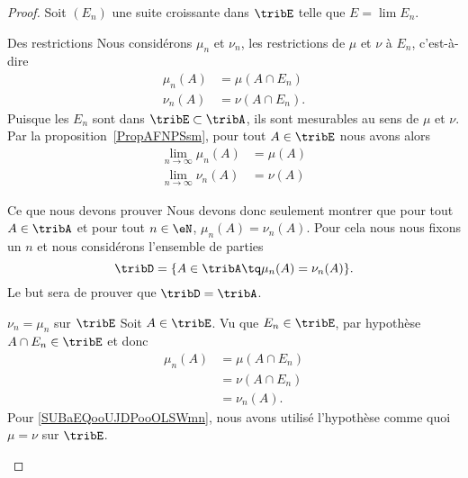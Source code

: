 \begin{proof}
	Soit \( (E_n)\) une suite croissante dans \( \tribE\) telle que \( E=\lim E_n\).

	\begin{subproof}
		\item[Des restrictions]
		Nous considérons \( \mu_n\) et \( \nu_n\), les restrictions de \( \mu\) et \( \nu\) à \( E_n\), c'est-à-dire
		\begin{subequations}
			\begin{align}
				\mu_n(A) & =\mu(A\cap E_n)  \\
				\nu_n(A) & =\nu(A\cap E_n).
			\end{align}
		\end{subequations}
		Puisque les \( E_n\) sont dans \( \tribE\subset\tribA\), ils sont mesurables au sens de \( \mu\) et \( \nu\). Par la proposition~\ref{PropAFNPSsm}, pour tout \( A\in \tribE\) nous avons alors
		\begin{subequations}
			\begin{align}
				\lim_{n\to \infty} \mu_n(A) & =\mu(A) \\
				\lim_{n\to \infty} \nu_n(A) & =\nu(A)
			\end{align}
		\end{subequations}
		\item[Ce que nous devons prouver]
		Nous devons donc seulement montrer que pour tout \( A\in\tribA\) et pour tout \( n\in\eN\), \( \mu_n(A)=\nu_n(A)\). Pour cela nous nous fixons un \( n\) et nous considérons l'ensemble de parties
		\begin{equation}
			\tribD=\{ A\in\tribA\tq\mu_n(A)=\nu_n(A) \}.
		\end{equation}
		Le but sera de prouver que \( \tribD=\tribA\).
		\item[\( \nu_n=\mu_n\) sur \( \tribE\)]
		Soit \( A\in \tribE\). Vu que \( E_n\in \tribE\), par hypothèse \( A\cap E_n\in\tribE\) et donc
		\begin{subequations}
			\begin{align}
				\mu_n(A) & =\mu(A\cap E_n)                                     \\
				         & =\nu(A\cap E_n)        \label{SUBaEQooUJDPooOLSWmn} \\
				         & =\nu_n(A).
			\end{align}
		\end{subequations}
		Pour \eqref{SUBaEQooUJDPooOLSWmn}, nous avons utilisé l'hypothèse comme quoi \( \mu=\nu\) sur \( \tribE\).


\end{subproof}
\end{proof}
